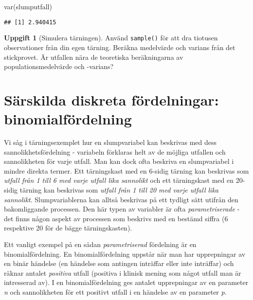 \documentclass[
]{book}
\newenvironment{Shaded}{\begin{snugshade}}{\end{snugshade}}
\newcommand{\FunctionTok}[1]{\textcolor[rgb]{0.00,0.00,0.00}{#1}}
\newcommand{\NormalTok}[1]{#1}
\theoremstyle{definition}
\theoremstyle{definition}
\theoremstyle{definition}
\newtheorem{exercise}{Uppgift}[chapter]
\theoremstyle{definition}
\theoremstyle{remark}
\begin{document}
\begin{Shaded}
\begin{Highlighting}[]
\FunctionTok{var}\NormalTok{(slumputfall)}
\end{Highlighting}
\end{Shaded}

\begin{verbatim}
## [1] 2.940415
\end{verbatim}

\begin{exercise}[Simulera tärningen]
Använd \texttt{sample()} för att dra tiotusen observationer från din egen tärning. Beräkna medelvärde och varians från det stickprovet. Är utfallen nära de teoretiska beräkningarna av populationsmedelvärde och -varians?
\end{exercise}

\hypertarget{suxe4rskilda-diskreta-fuxf6rdelningar-binomialfuxf6rdelning}{%
\section{Särskilda diskreta fördelningar: binomialfördelning}\label{suxe4rskilda-diskreta-fuxf6rdelningar-binomialfuxf6rdelning}}

Vi såg i tärningsexemplet hur en slumpvariabel kan beskrivas med dess sannolikhetsfördelning - variabeln förklaras helt av de möjliga utfallen och sannolikheten för varje utfall. Man kan dock ofta beskriva en slumpvariabel i mindre direkta termer. Ett tärningskast med en 6-sidig tärning kan beskrivas som \emph{utfall från 1 till 6 med varje utfall lika sannolikt} och ett tärningskast med en 20-sidig tärning kan beskrivas som \emph{utfall från 1 till 20 med varje utfall lika sannolikt}. Slumpvariablerna kan alltså beskrivas på ett tydligt sätt utifrån den bakomliggande processen. Den här typen av variabler är ofta \emph{parametriserade} - det finns någon aspekt av processen som beskrivs med en bestämd siffra (6 respektive 20 för de bägge tärningskasten).

Ett vanligt exempel på en sådan \emph{parametriserad} fördelning är en binomialfördelning. En binomialfördelning uppstår när man har upprepningar av en binär händelse (en händelse som antingen inträffar eller inte inträffar) och räknar antalet \emph{positiva} utfall (positiva i klinisk mening som något utfall man är intresserad av). I en binomialfördelning ges antalet upprepningar av en parameter \emph{n} och sannolikheten för ett positivt utfall i en händelse av en parameter \emph{p}.
\end{document}
